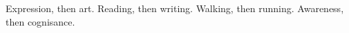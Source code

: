 

Expression, then art.  Reading, then writing.  Walking, then running.
Awareness, then cognisance.

\bye
